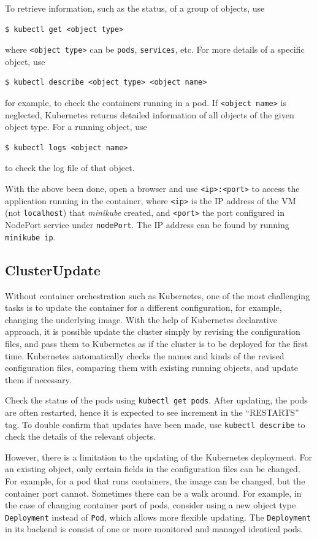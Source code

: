 To retrieve information, such as the status, of a group of objects, use
\begin{lstlisting}
$ kubectl get <object type>
\end{lstlisting}
where \verb|<object type>| can be \verb|pods|, \verb|services|, etc. For more details of a specific object, use
\begin{lstlisting}
$ kubectl describe <object type> <object name>
\end{lstlisting}
for example, to check the containers running in a pod. If \verb|<object name>| is neglected, Kubernetes returns detailed information of all objects of the given object type. For a running object, use
\begin{lstlisting}
$ kubectl logs <object name>
\end{lstlisting}
to check the log file of that object.

With the above been done, open a browser and use \verb|<ip>:<port>| to access the application running in the container, where \verb|<ip>| is the IP address of the VM (not \verb|localhost|) that \textit{minikube} created, and \verb|<port>| the port configured in NodePort service under \verb|nodePort|. The IP address can be found by running \verb|minikube ip|.

\subsection{ClusterUpdate} \label{ch:vac:subsec:updatek8s}

Without container orchestration such as Kubernetes, one of the most challenging tasks is to update the container for a different configuration, for example, changing the underlying image. With the help of Kubernetes declarative approach, it is possible update the cluster simply by revising the configuration files, and pass them to Kubernetes as if the cluster is to be deployed for the first time. Kubernetes automatically checks the names and kinds of the revised configuration files, comparing them with existing running objects, and update them if necessary.

Check the status of the pods using \verb|kubectl get pods|. After updating, the pods are often restarted, hence it is expected to see increment in the ``RESTARTS'' tag. To double confirm that updates have been made, use \verb|kubectl describe| to check the details of the relevant objects.

However, there is a limitation to the updating of the Kubernetes deployment. For an existing object, only certain fields in the configuration files can be changed. For example, for a pod that runs containers, the image can be changed, but the container port cannot. Sometimes there can be a walk around. For example, in the case of changing container port of pods, consider using a new object type \verb|Deployment| instead of \verb|Pod|, which allows more flexible updating. The \verb|Deployment| in its backend is consist of one or more monitored and managed identical pods.

